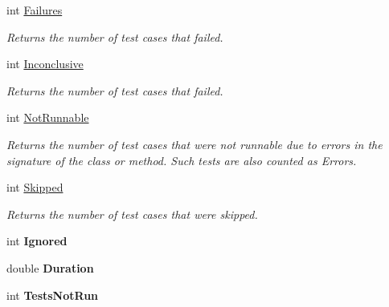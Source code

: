 \begin{DoxyCompactItemize}
int \hyperlink{class_unity_test_1_1_result_summarizer_ae35cdf403fdbc166a21e45c69d43fd33}{Failures}
\begin{DoxyCompactList}\small\item\em Returns the number of test cases that failed. \end{DoxyCompactList}\item 
int \hyperlink{class_unity_test_1_1_result_summarizer_a0feb00e5dd27d55296c2c0831c122f6f}{Inconclusive}
\begin{DoxyCompactList}\small\item\em Returns the number of test cases that failed. \end{DoxyCompactList}\item 
int \hyperlink{class_unity_test_1_1_result_summarizer_aad69952763ca19c491beb984a3b66ffb}{Not\+Runnable}
\begin{DoxyCompactList}\small\item\em Returns the number of test cases that were not runnable due to errors in the signature of the class or method. Such tests are also counted as Errors. \end{DoxyCompactList}\item 
int \hyperlink{class_unity_test_1_1_result_summarizer_a80b800e5fcdea3ed9fb2959a4183bc04}{Skipped}
\begin{DoxyCompactList}\small\item\em Returns the number of test cases that were skipped. \end{DoxyCompactList}\item 
\mbox{\label{class_unity_test_1_1_result_summarizer_a8b17df3dbd67628019c75c2062d72cf3}} 
int {\bfseries Ignored}
\item 
\mbox{\label{class_unity_test_1_1_result_summarizer_adc65280f39d9a6c1bb101d23b26dcf58}} 
double {\bfseries Duration}
\item 
\mbox{\label{class_unity_test_1_1_result_summarizer_af662dad814cef005a002d00110dafba4}} 
int {\bfseries Tests\+Not\+Run}
\end{DoxyCompactItemize}
